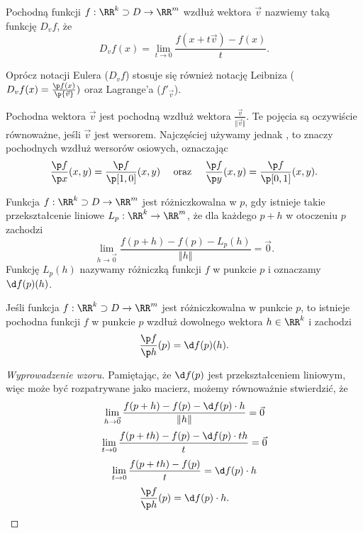 \begin{definition}
    Pochodną funkcji $f : \RR^k \supset D \to \RR^m$ wzdłuż wektora $\vec{v}$ nazwiemy taką funkcję $D_v f$, że
    \[ D_v f(x) = \lim_{t\to 0}\frac{f(x + t\vec{v}) - f(x)}{t}. \]
\end{definition}

Oprócz notacji Eulera ($D_v f$) stosuje się również notację Leibniza ($D_v f(x) = \frac{\p f(x)}{\p{\vec{v}}})$ oraz  Lagrange'a ($f'_{\vec{v}}$).

Pochodna  wektora $\vec{v}$ jest pochodną wzdłuż wektora $\frac{\vec{v}}{\Vert\vec{v}\Vert}$. Te pojęcia są oczywiście równoważne, jeśli $\vec{v}$ jest wersorem. Najczęściej używamy jednak , to znaczy pochodnych wzdłuż wersorów osiowych, oznaczając
\[ \frac{\p f}{\p x}(x, y) = \frac{\p f}{\p [1, 0]}(x, y) \hspace{1em}\text{ oraz }\hspace{1em} \frac{\p f}{\p y}(x, y) = \frac{\p f}{\p [0, 1]}(x, y). \]

\begin{definition}[różniczka]
    Funkcja $f : \RR^k \supset D \to \RR^m$ jest różniczkowalna w $p$, gdy istnieje takie przekształcenie liniowe $L_{p} : \RR^k \to \RR^m$, że dla każdego $p + h$ w otoczeniu $p$ zachodzi
    \[ \lim_{h\to\vec{0}} \frac{f(p + h) - f(p) - L_{p}(h)}{\Vert h \Vert} = \vec{0}. \]
    Funkcję $L_{p}(h)$ nazywamy różniczką funkcji $f$ w punkcie $p$ i oznaczamy $\d f(p)(h)$.
\end{definition}

\begin{theorem}
    \label{t:differentiability implies derivability}
    Jeśli funkcja $f : \RR^k \supset D \to \RR^m$ jest różniczkowalna w punkcie $p$, to istnieje pochodna funkcji $f$ w punkcie $p$ wzdłuż dowolnego wektora $h \in \RR^k$ i zachodzi
    \[ \frac{\p f}{\p h}(p) = \d f(p)(h). \]
\end{theorem}
\begin{proof}[Wyprowadzenie wzoru]
    Pamiętając, że $\d f(p)$ jest przekształceniem liniowym, więc może być rozpatrywane jako macierz, możemy równoważnie stwierdzić, że
    \[ \lim_{h\to\vec{0}} \frac{f(p + h) - f(p) - \d f(p) \cdot h}{\Vert h \Vert} = \vec{0} \]
    \[ \lim_{t\to 0} \frac{f(p + th) - f(p) - \d f(p) \cdot th}{t} = \vec{0} \]
    \[ \lim_{t\to 0} \frac{f(p + th) - f(p)}{t} = \d f(p)\cdot h \]
    \[ \frac{\p f}{\p h}(p) = \d f(p)\cdot h. \]
\end{proof}

